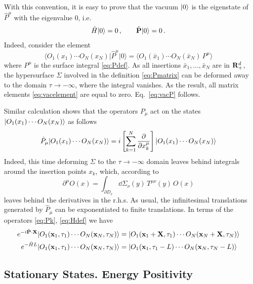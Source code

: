 With this convention, it is easy to prove that the vacuum $|0\rangle$ is the eigenstate
of $\hat P^\mu$ with the eigenvalue 0, i.e.
\begin{equation}\label{eq:vacP}
\hat H|0\rangle=0\,,\qquad\hat{\mathbf{P}}|0\rangle=0\,.
\end{equation}
Indeed, consider the element
\begin{equation}\label{eq:vacelement}
\bigl\langle O_1(x_1)\cdots O_N(x_N)\big|\hat P^\mu\big|0\bigr\rangle=\bigl\langle O_1(\bar x_1)\cdots O_N(\bar x_N)\,P^\mu\bigr\rangle
\end{equation}
where $P^\mu$ is the surface integral \eqref{eq:Pdef}. As all insertions
$\bar x_1,\dots,\bar x_N$ are in $\mathbf{R}^d_+$, the hypersurface $\Sigma$ involved in the
definition \eqref{eq:Pmatrix} can be deformed away to the domain $\tau\to-\infty$,
where the integral vanishes. As the result, all matrix elements
\eqref{eq:vacelement} are equal to zero. Eq.~\eqref{eq:vacP} follows.

Similar calculation shows that the operators $P_\mu$ act on the states
$|O_1(x_1)\cdots O_N(x_N)\rangle$ as follows
\[
\hat P_\mu|O_1(x_1)\cdots O_N(x_N)\rangle=i\left[\sum_{k=1}^N\frac\partial{\partial x_k^\mu}\right]|O_1(x_1)\cdots O_N(x_N)\rangle
\]
Indeed, this time deforming $\Sigma$ to the $\tau\to-\infty$ domain leaves behind
integrals around the insertion points $x_k$, which, according to
\[
\partial^\mu O(x)=\int_{\partial D_x}\dd\Sigma_\nu(y)\,T^{\mu\nu}(y)\,O(x)
\]
leaves behind the derivatives in the r.h.s. As usual, the infinitesimal
translations generated by $\hat P_\mu$ can be exponentiated to finite translations.
In terms of the operators \eqref{eq:Pk}, \eqref{eq:Hdef} we have
\begin{equation}\label{eq:finitetr}
\begin{aligned}
e^{-i\hat{\mathbf{P}}\cdot\mathbf X}|O_1(\mathbf{x}_1,\tau_1)\cdots O_N(\mathbf{x}_N,\tau_N)\rangle&=|O_1(\mathbf{x}_1+\mathbf X,\tau_1)\cdots O_N(\mathbf{x}_N+\mathbf X,\tau_N)\rangle\\
e^{-\hat HL}|O_1(\mathbf{x}_1,\tau_1)\cdots O_N(\mathbf{x}_N,\tau_N)\rangle&=|O_1(\mathbf{x}_1,\tau_1-L)\cdots O_N(\mathbf{x}_N,\tau_N-L)\rangle
\end{aligned}
\end{equation}

\subsection*{Stationary States. Energy Positivity}

